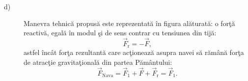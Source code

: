 \begin{description}
\item[d)] Manevra tehnic\u{a} propus\u{a} este reprezentat\u{a} \^in figura
  al\u{a}turat\u{a}: o for\c{t}\u{a} reactiv\u{a}, egal\u{a} \^in modul
  \c{s}i de sens contrar cu tensiunea din tij\u{a}: %
  \[
    \vec F_{\mathrm{r}} = -\vec F,
  \]
  astfel \^inc\^at for\c{t}a rezultant\u{a} care ac\c{t}ioneaz\u{a} asupra
  navei s\u{a} r\u{a}m\^an\u{a} for\c{t}a de atrac\c{t}ie
  gravita\c{t}ional\u{a} din partea P\u{a}m\^antului:
  \[
    \vec F_{\mathrm{Nava}} = \vec F_1 + \vec F + \vec F_{\mathrm{r}}
      = \vec F_1.
  \]

\end{description}

